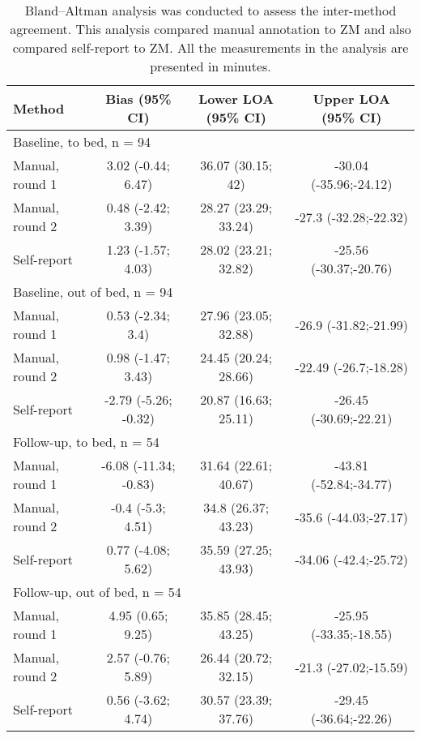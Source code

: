 \documentclass[
  10pt,
]{scrbook}
\begin{document}
\hypertarget{tbl-7}{}
\begin{longtable}{lccc}
\caption{\label{tbl-7}Bland--Altman analysis was conducted to assess the inter-method
agreement. This analysis compared manual annotation to ZM and also
compared self-report to ZM. All the measurements in the analysis are
presented in minutes. }\tabularnewline

\toprule
Method & Bias  (95\% CI) & Lower LOA (95\% CI) & Upper LOA (95\% CI) \\ 
\midrule
\multicolumn{4}{l}{Baseline, to bed, n = 94} \\ 
\midrule
Manual, round 1 & 3.02 (-0.44; 6.47) & 36.07 (30.15; 42) & -30.04 (-35.96;-24.12) \\ 
Manual, round 2 & 0.48 (-2.42; 3.39) & 28.27 (23.29; 33.24) & -27.3 (-32.28;-22.32) \\ 
Self-report & 1.23 (-1.57; 4.03) & 28.02 (23.21; 32.82) & -25.56 (-30.37;-20.76) \\ 
\midrule
\multicolumn{4}{l}{Baseline, out of bed, n = 94} \\ 
\midrule
Manual, round 1 & 0.53 (-2.34; 3.4) & 27.96 (23.05; 32.88) & -26.9 (-31.82;-21.99) \\ 
Manual, round 2 & 0.98 (-1.47; 3.43) & 24.45 (20.24; 28.66) & -22.49 (-26.7;-18.28) \\ 
Self-report & -2.79 (-5.26; -0.32) & 20.87 (16.63; 25.11) & -26.45 (-30.69;-22.21) \\ 
\midrule
\multicolumn{4}{l}{Follow-up, to bed, n = 54} \\ 
\midrule
Manual, round 1 & -6.08 (-11.34; -0.83) & 31.64 (22.61; 40.67) & -43.81 (-52.84;-34.77) \\ 
Manual, round 2 & -0.4 (-5.3; 4.51) & 34.8 (26.37; 43.23) & -35.6 (-44.03;-27.17) \\ 
Self-report & 0.77 (-4.08; 5.62) & 35.59 (27.25; 43.93) & -34.06 (-42.4;-25.72) \\ 
\midrule
\multicolumn{4}{l}{Follow-up, out of bed, n = 54} \\ 
\midrule
Manual, round 1 & 4.95 (0.65; 9.25) & 35.85 (28.45; 43.25) & -25.95 (-33.35;-18.55) \\ 
Manual, round 2 & 2.57 (-0.76; 5.89) & 26.44 (20.72; 32.15) & -21.3 (-27.02;-15.59) \\ 
Self-report & 0.56 (-3.62; 4.74) & 30.57 (23.39; 37.76) & -29.45 (-36.64;-22.26) \\ 
\bottomrule
\end{longtable}

\endgroup
\end{document}
